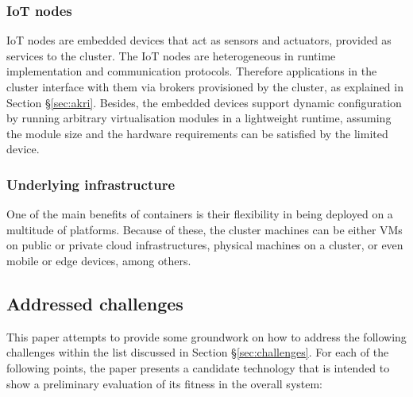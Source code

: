 \subsubsection{IoT nodes}

IoT nodes are embedded devices that act as sensors and actuators, provided as services to the cluster. The IoT nodes are heterogeneous in runtime implementation and communication protocols. Therefore applications in the cluster interface with them via brokers provisioned by the cluster, as explained in Section §\ref{sec:akri}. Besides, the embedded devices support dynamic configuration by running arbitrary virtualisation modules in a lightweight runtime, assuming the module size and the hardware requirements can be satisfied by the limited device.

\subsubsection{Underlying infrastructure}

One of the main benefits of containers is their flexibility in being deployed on a multitude of platforms. Because of these, the cluster machines can be either VMs on public or private cloud infrastructures, physical machines on a cluster, or even mobile or edge devices, among others.

\subsection{Addressed challenges}

This paper attempts to provide some groundwork on how to address the following challenges within the list discussed in Section §\ref{sec:challenges}. For each of the following points, the paper presents a candidate technology that is intended to show a preliminary evaluation of its fitness in the overall system:

